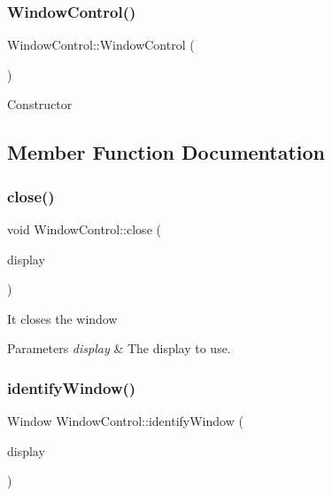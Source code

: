 \subsubsection{\texorpdfstring{Window\+Control()}{WindowControl()}}
{\footnotesize\ttfamily Window\+Control\+::\+Window\+Control (\begin{DoxyParamCaption}\item[{void}]{ }\end{DoxyParamCaption})}

Constructor 

\subsection{Member Function Documentation}
\mbox{\label{classWindowControl_a2f521062be8be113d1cbcca4f495d693}} 
\subsubsection{\texorpdfstring{close()}{close()}}
{\footnotesize\ttfamily void Window\+Control\+::close (\begin{DoxyParamCaption}\item[{Display $\ast$}]{display }\end{DoxyParamCaption})}

It closes the window


\begin{DoxyParams}{Parameters}
{\em display} & The display to use. \\
\hline
\end{DoxyParams}
\mbox{\label{classWindowControl_aad092a22b19664df4d94fe9a853d350a}} 
\subsubsection{\texorpdfstring{identify\+Window()}{identifyWindow()}}
{\footnotesize\ttfamily Window Window\+Control\+::identify\+Window (\begin{DoxyParamCaption}\item[{Display $\ast$}]{display }\end{DoxyParamCaption})}


